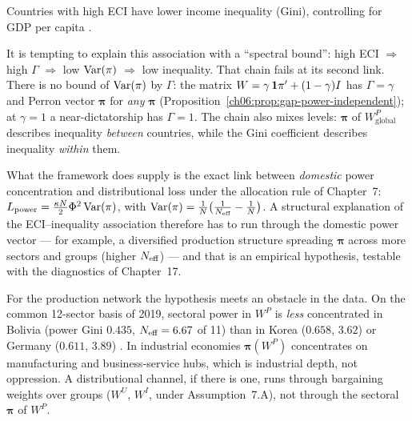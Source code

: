 \documentclass[../structural_economics_book.tex]{subfiles}
\begin{document}
\begin{empiricalresult}\label{ch16:prop:ECI_inequality}
Countries with high ECI have lower income inequality (Gini), controlling for GDP per capita \citep[who report robustness across specifications and data sources]{hartmann2017linking}.
\end{empiricalresult}

\begin{remark}\label{ch16:thm:ECI_inequality}
It is tempting to explain this association with a ``spectral bound'': high ECI $\Rightarrow$ high $\Gamma$ $\Rightarrow$ low $\operatorname{Var}(\pi)$ $\Rightarrow$ low inequality. That chain fails at its second link. There is no bound of $\operatorname{Var}(\pi)$ by $\Gamma$: the matrix $W = \gamma\,\mathbf{1}\pi' + (1-\gamma)I$ has $\Gamma = \gamma$ and Perron vector $\boldsymbol{\pi}$ for \emph{any} $\boldsymbol{\pi}$ (Proposition~\ref{ch06:prop:gap-power-independent}); at $\gamma = 1$ a near-dictatorship has $\Gamma = 1$. The chain also mixes levels: $\boldsymbol{\pi}$ of $W^P_{\text{global}}$ describes inequality \emph{between} countries, while the Gini coefficient describes inequality \emph{within} them.

What the framework does supply is the exact link between \emph{domestic} power concentration and distributional loss under the allocation rule of Chapter~7: $L_{\text{power}} = \frac{\kappa N}{2}\Phi^2\operatorname{Var}(\pi)$, with $\operatorname{Var}(\pi) = \frac{1}{N}\big(\frac{1}{N_{\text{eff}}} - \frac{1}{N}\big)$. A structural explanation of the ECI--inequality association therefore has to run through the domestic power vector --- for example, a diversified production structure spreading $\boldsymbol{\pi}$ across more sectors and groups (higher $N_{\text{eff}}$) --- and that is an empirical hypothesis, testable with the diagnostics of Chapter~17.

For the production network the hypothesis meets an obstacle in the data. On the common 12-sector basis of 2019, sectoral power in $W^P$ is \emph{less} concentrated in Bolivia (power Gini $0.435$, $N_{\text{eff}} = 6.67$ of 11) than in Korea ($0.658$, $3.62$) or Germany ($0.611$, $3.89$) \citep{ine2026sut,oecd2023icio}. In industrial economies $\boldsymbol{\pi}(W^P)$ concentrates on manufacturing and business-service hubs, which is industrial depth, not oppression. A distributional channel, if there is one, runs through bargaining weights over groups ($W^U$, $W^I$, under Assumption~7.A), not through the sectoral $\boldsymbol{\pi}$ of $W^P$.
\end{remark}
\end{document}
